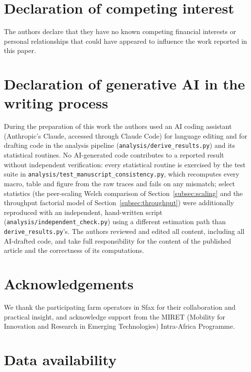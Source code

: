 \documentclass[a4paper,fleqn]{cas-sc}
\begin{document}
\section*{Declaration of competing interest}

The authors declare that they have no known competing financial interests or
personal relationships that could have appeared to influence the work
reported in this paper.

\section*{Declaration of generative AI in the writing process}

During the preparation of this work the authors used an AI coding
assistant (Anthropic's Claude, accessed through Claude Code) for language
editing and for drafting code in the analysis pipeline
(\texttt{analysis/derive\_results.py}) and its statistical routines. No
AI-generated code contributes to a reported result without independent
verification: every statistical routine is exercised by the test suite in
\texttt{analysis/test\_manuscript\_consistency.py}, which recomputes every
macro, table and figure from the raw traces and fails on any mismatch;
select statistics (the peer-scaling Welch comparison of
Section~\ref{subsec:scaling} and the throughput factorial model of
Section~\ref{subsec:throughput}) were additionally reproduced with an
independent, hand-written script (\texttt{analysis/independent\_check.py})
using a different estimation path than \texttt{derive\_results.py}'s. The
authors reviewed and edited all content, including all AI-drafted code,
and take full responsibility for the content of the published article and
the correctness of its computations.

\section*{Acknowledgements}

We thank the participating farm operators in Sfax for their collaboration and
practical insight, and acknowledge support from the MIRET (Mobility for
Innovation and Research in Emerging Technologies) Intra-Africa Programme.

\section*{Data availability}
\end{document}
